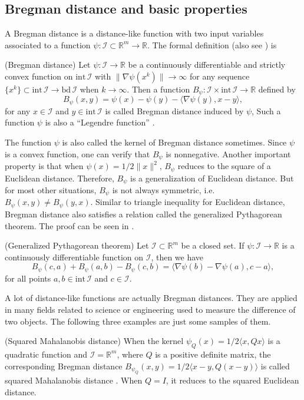 \documentclass{svjour3}                %
\def \R {{\mathbb{R}}}
\def \I {{\mathcal{I}}}
\def\nn{\nonumber}
\newcommand{\inter}[1]{\mathrm{int}\,{#1}} %
\newcommand{\bd}[1]{\mathrm{bd}\,{#1}} %
\begin{document}
\subsection{Bregman distance and basic properties}
A Bregman distance is a distance-like function with two input variables associated to a function $\psi:\I\subset\R^m\rightarrow\R$. The formal definition (also see \cite[Chapter 26]{R70}) is
\begin{definition}
(Bregman distance) Let $\psi:\I\rightarrow \R$ be a continuously differentiable and strictly convex function on $\inter \I$ with $\|\nabla \psi(x^k)\|\rightarrow\infty$ for any sequence $\{x^k\}\subset\inter\I\rightarrow\bd \I$ when $k\rightarrow\infty$. Then a function $B_{\psi}:\I \times \inter \I \rightarrow \R$ defined by
\begin{equation*}
	B_{\psi}(x,y)=\psi(x)-\psi(y)-\langle \nabla \psi (y),x-y \rangle,
\end{equation*}
for any $x\in\I$ and $y\in\inter\I$ is called Bregman distance induced by $\psi$, Such a function $\psi$ is also a ``Legendre function'' \cite{BJ97}.
\end{definition}
The function $\psi$ is also called the kernel of Bregman distance sometimes. Since $\psi$ is a convex function, one can verify that $B_{\psi}$ is nonnegative. Another important property is that when $\psi(x)=1/2\|x\|^2$, $B_{\psi}$ reduces to the square of a Euclidean distance. Therefore, $B_{\psi}$ is a generalization of Euclidean distance. But for most other situations, $B_{\psi}$ is not always symmetric, i.e. $B_{\psi}(x,y)\neq B_{\psi}(y,x)$. Similar to triangle inequality for Euclidean distance, Bregman distance also satisfies a relation called the generalized Pythagorean theorem. The proof can be seen in \cite[Lemma 4.1]{AM03}.
\begin{proposition}\label{GPT}
(Generalized Pythagorean theorem) Let $\I\subset\R^m$ be a closed set. If $\psi:\I \rightarrow \R$ is a continuously differentiable function on $\I$, then we have
\begin{equation}
	B_{\psi}(c,a)+B_{\psi}(a,b)-B_{\psi}(c,b)=\langle \nabla \psi (b) - \nabla \psi (a),c-a \rangle,\nn
\end{equation}
for all points $a,b\in \inter \I$ and $c\in \I$.
\end{proposition}

A lot of distance-like functions are actually Bregman distances. They are applied in many fields related to science or engineering used to measure the difference of two objects. The following three examples are just some samples of them.
\begin{example}
(Squared Mahalanobis distance)  When the kernel $\psi_Q(x)=1/2\langle x,Qx \rangle$ is a quadratic function and $\I=\R^m$, where $Q$ is a positive definite matrix, the corresponding Bregman distance $B_{\psi_Q}(x,y)=1/2\langle x-y,Q(x-y) \rangle$ is called squared Mahalanobis distance \cite{M36}. When $Q=I$, it reduces to the squared Euclidean distance.
\end{example}
\end{document}

